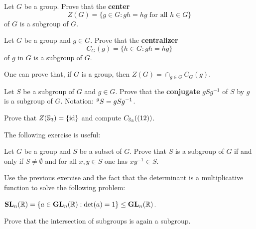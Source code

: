\begin{exercise}
        Let $G$ be a group. Prove that the \textbf{center} 
        \[
                Z(G)=\{g\in G:gh=hg\text{ for all $h\in G$}\}
        \]
        of $G$ is a subgroup of $G$. 
\end{exercise}

\begin{exercise}
        Let $G$ be a group and $g\in G$. Prove that
        the \textbf{centralizer}
        \[
                C_G(g)=\{h\in G:gh=hg\}
        \]
        of $g$ in $G$ is a subgroup of $G$. 
\end{exercise}

One can prove that, if $G$ is a group, then
$Z(G)=\cap_{g\in G}C_G(g)$. 

\begin{exercise}
        \label{xca:conjugate_subgroup}
        Let $S$ be a subgroup of $G$ and $g\in G$. Prove that
        the \textbf{conjugate} $gSg^{-1}$
        of $S$ by $g$ is a subgroup of $G$. 
        Notation: $\prescript{g}{}S=gSg^{-1}$.
\end{exercise}


\begin{exercise}
        Prove that $Z(\mathbb{S}_3)=\{\operatorname{id}\}$ and compute $C_{\mathbb{S}_3}((12))$.
\end{exercise}

The following exercise is useful: 

\begin{exercise}
        Let $G$ be a group and $S$ be a subset of $G$. 
        Prove that $S$ is a subgroup of $G$ if and only if 
        $S\ne\emptyset$ and for all $x,y\in S$ one has
        $xy^{-1}\in S$.
\end{exercise}

Use the previous exercise and
the fact that the determinant is a multiplicative function
to solve the following problem:

\begin{exercise}
\label{xca:SL_subgroup}
$\mathbf{SL}_n(\mathbb{R})=\{a\in\mathbf{GL}_n(\mathbb{R}):\det(a)=1\}\leq\mathbf{GL}_n(\mathbb{R})$. 
\end{exercise}

\begin{exercise}
\label{xca:intersection}
    Prove that the intersection of subgroups is again a subgroup.
\end{exercise}

